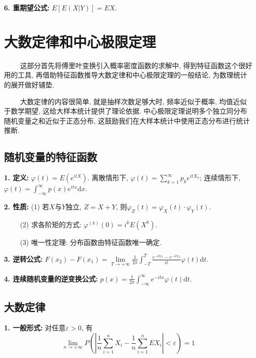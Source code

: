 \textbf{6. 重期望公式: }$E[E(X|Y)]=EX$.

\section{大数定律和中心极限定理}

\begin{tcolorbox}[colback=red!5,colframe=red!75!black]
    ~~~~ 这部分首先将傅里叶变换引入概率密度函数的求解中, 得到特征函数这个很好用的工具, 再借助特征函数推导大数定律和中心极限定理的一般结论, 为数理统计的展开做好铺垫.
    
    ~~~~ 大数定律的内容很简单, 就是抽样次数足够大时, 频率近似于概率, 均值近似于数学期望, 这给大样本统计提供了理论依据. 中心极限定理说明多个独立同分布随机变量之和近似于正态分布, 这鼓励我们在大样本统计中使用正态分布进行统计推断.
\end{tcolorbox}

\subsection{随机变量的特征函数}

\textbf{1. 定义: }$\varphi(t)=E(e^{itX})$. 离散情形下, $\varphi(t)=\sum\limits_{k=1}^\infty p_ke^{itX_k}$; 连续情形下, $\varphi(t)=\int_{-\infty}^\infty p(x)e^{itx}\mathrm{d}x$.

\textbf{2. 性质: }(1) 若$X$与$Y$独立, $Z=X+Y$, 则$\varphi_Z(t)=\varphi_X(t)\cdot \varphi_Y(t)$.

~~~~ (2) 求各阶矩的方式: $\varphi^{(k)}(0)=i^kE(X^k)$.

~~~~ (3) 唯一性定理: 分布函数由特征函数唯一确定.

\textbf{3. 逆转公式: }$F(x_2)-F(x_1)=\lim\limits_{T\rightarrow +\infty}\frac{1}{2\pi}\int_{-T}^T \frac{e^{-itx_1}-e^{-itx_2}}{it}\varphi(t)\mathrm{d}t$.

\textbf{4. 连续随机变量的逆变换公式: }$p(x)=\frac{1}{2\pi} \int_{-\infty}^\infty e^{-itx}\varphi(t)\mathrm{d}t$.

\subsection{大数定律}

\textbf{1. 一般形式: }对任意$\varepsilon>0$, 有
\begin{equation*}
    \lim\limits_{n\rightarrow +\infty} P\left(\left| \frac{1}{n}\sum\limits_{i=1}^n X_i-\frac{1}{n}\sum\limits_{i=1}^n EX_i \right|<\varepsilon\right)=1
\end{equation*}

